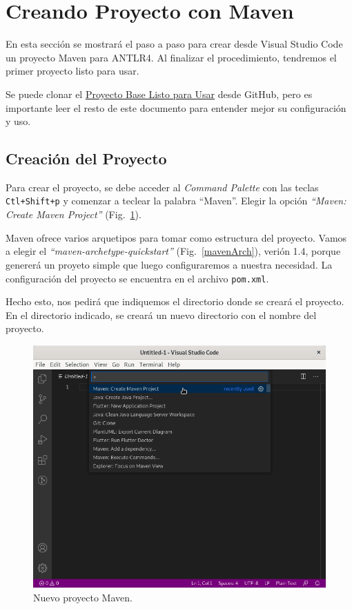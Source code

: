 \section{Creando Proyecto con Maven}
\label{proyMaven}

En esta sección se mostrará el paso a paso para crear desde Visual Studio Code un proyecto Maven para ANTLR4.  Al finalizar el procedimiento, tendremos el primer proyecto listo para usar.

Se puede clonar el \href{https://github.com/meschoyez/BaseCompiladores}{Proyecto Base Listo para Usar} desde GitHub, pero es importante leer el resto de este documento para entender mejor su configuración y uso.

\subsection{Creación del Proyecto}
\label{creacionProy}

Para crear el proyecto, se debe acceder al \emph{Command Palette} con las teclas \verb|Ctl+Shift+p| y comenzar a teclear la palabra ``Maven''. Elegir la opción \emph{``Maven: Create Maven Project''} (Fig.~\ref{mavenNuevo}).

Maven ofrece varios arquetipos para tomar como estructura del proyecto.  Vamos a elegir el \emph{``maven-archetype-quickstart''} (Fig.~\ref{mavenArch}), verión 1.4, porque genererá un proyeto simple que luego configuraremos a nuestra necesidad.  La configuración del proyecto se encuentra en el archivo \verb|pom.xml|.

Hecho esto, nos pedirá que indiquemos el directorio donde se creará el proyecto.  En el directorio indicado, se creará un nuevo directorio con el nombre del proyecto.

\begin{figure}[t]
	\centering
	\includegraphics[width=.95\textwidth]{img/CrearMavenProject}
	\caption{Nuevo proyecto Maven.}
	\label{mavenNuevo}
\end{figure}

